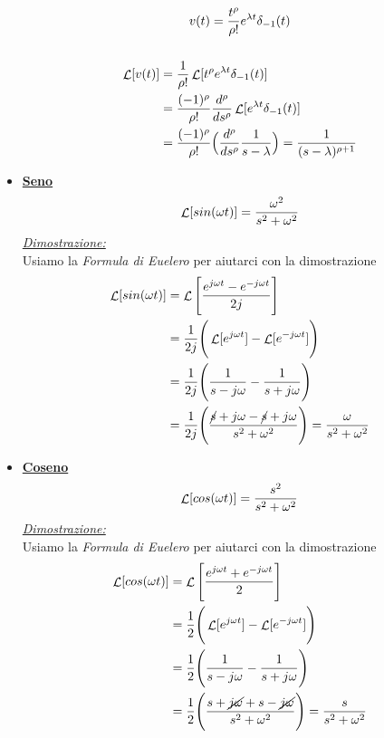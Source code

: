 \documentclass{article}
\newcommand{\Laplace}{\mathop{\mathcal{L}}}
\begin{document}
\begin{itemize}
					  \[
					  	\begin{gathered}
					  		v(t) = {{t^\rho}\over{\rho!}}e^{\lambda t}\delta_{-1}(t) \\
							\\
							\begin{aligned}
								\Laplace[v(t)] &= {1\over{\rho!}} \Laplace[t^{\rho} e^{\lambda t} \delta_{-1}(t)] \\
								&= {{(-1)^\rho}\over{\rho!}} {d^{\rho}\over{ds^{\rho}}} \Laplace[e^{\lambda t}\delta_{-1}(t)] \\
								&= {{(-1)^\rho}\over{\rho!}} \Big( {d^{\rho}\over{ds^{\rho}}} {1\over{s-\lambda}} \Big) = {1\over{(s-\lambda)^{\rho + 1}}}
							\end{aligned}
					  	\end{gathered}
					  \]
				\item \underline{\textbf{Seno}} \\
					  \[
					  	\Laplace[sin(\omega t)] = {{\omega^2}\over{s^2 + \omega^2}}
					  \]
					  \underline{\textit{Dimostrazione:}} \\
					  Usiamo la \textit{Formula di Euelero} per aiutarci con la dimostrazione
					  \[
					  	\begin{aligned}
					  		\Laplace[sin(\omega t)] &= \Laplace\Bigg[ {{e^{j\omega t} - e^{-j\omega t}}\over{2j}} \Bigg] \\
							&= {{1}\over{2j}}\Bigg( \Laplace[e^{j\omega t}] - \Laplace[e^{-j\omega t}] \Bigg) \\
							&= {{1}\over{2j}}\Bigg( {{1}\over{s - j\omega}} - {{1}\over{s + j\omega}} \Bigg) \\
							&= {{1}\over{2j}}\Bigg( {{\cancel{s} + j\omega - \cancel{s} + j\omega}\over{s^2 + \omega^2}} \Bigg) = {{\omega}\over{s^2 + \omega^2}}
					  	\end{aligned}
					  \]
				\item \underline{\textbf{Coseno}} \\
					  \[
					    \Laplace[cos(\omega t)] = {{s^2}\over{s^2 + \omega^2}}
					  \]
					  \underline{\textit{Dimostrazione:}} \\
					  Usiamo la \textit{Formula di Euelero} per aiutarci con la dimostrazione
					  \[
					  	\begin{aligned}
					  		\Laplace[cos(\omega t)] &= \Laplace\Bigg[ {{e^{j\omega t} + e^{-j\omega t}}\over{2}} \Bigg] \\
							&= {{1}\over{2}}\Bigg( \Laplace[e^{j\omega t}] - \Laplace[e^{-j\omega t}] \Bigg) \\
							&= {{1}\over{2}}\Bigg( {{1}\over{s - j\omega}} - {{1}\over{s + j\omega}} \Bigg) \\
							&= {{1}\over{2}}\Bigg( {{s + \cancel{j\omega} + s - \cancel{j\omega}}\over{s^2 + \omega^2}} \Bigg) = {{s}\over{s^2 + \omega^2}}
					  	\end{aligned}
					  \]
			\end{itemize}
\end{document}

